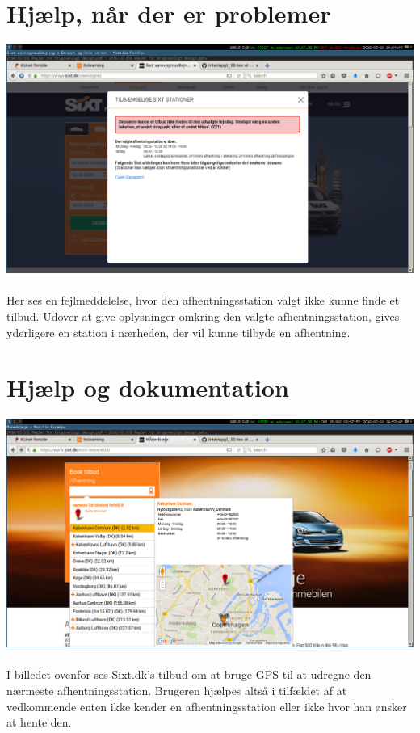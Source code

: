 \documentclass[12pt]{article}
\begin{document}
\section{Hjælp, når der er problemer}

\includegraphics[scale=0.3]{img/Udlej222}
\\
\\
Her ses en fejlmeddelelse, hvor den afhentningsstation valgt ikke kunne finde et tilbud. Udover at give oplysninger omkring den valgte afhentningsstation, gives yderligere en station i nærheden, der vil kunne tilbyde en afhentning.

\section{Hjælp og dokumentation}

\includegraphics[scale=0.3]{img/NaermesteUdlejning}
\\
\\
I billedet ovenfor ses Sixt.dk's tilbud om at bruge GPS til at udregne den nærmeste afhentningsstation. Brugeren hjælpes altså i tilfældet af at vedkommende enten ikke kender en afhentningsstation eller ikke hvor han ønsker at hente den.
\end{document}
